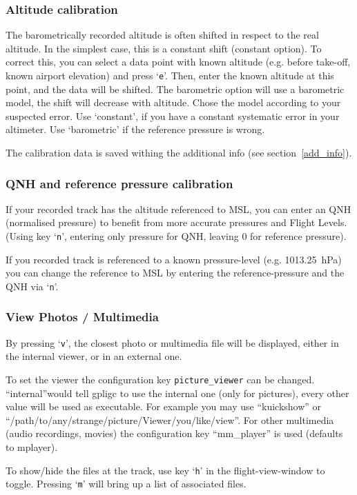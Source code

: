 \subsubsection{Altitude calibration}
The barometrically recorded altitude is often shifted in respect to the real altitude.
In the simplest case, this is a constant shift (constant option).
To correct this, you can select a data point with known altitude
(e.g. before take-off, known airport elevation) and press `\texttt{e}'.
Then, enter the known altitude at this point, and the data will be shifted.
The barometric option will use a barometric model, the shift will decrease with altitude.
Chose the model according to your suspected error. Use `constant', if you have a constant systematic error in your altimeter.
Use `barometric' if the reference pressure is wrong.

The calibration data is saved withing the additional info (see section~\ref{add_info}).


\subsubsection{QNH and reference pressure calibration}
If your recorded track has the altitude referenced to MSL, you can enter an QNH (normalised pressure) to benefit from more accurate pressures and Flight Levels.
(Using key `\texttt{n}', entering only pressure for QNH, leaving 0 for reference pressure).

If you recorded track is referenced to a known pressure-level (e.g. 1013.25~hPa) you can change the reference to MSL by entering the reference-pressure and the QNH via `\texttt{n}'.


\subsubsection{View Photos / Multimedia}
By pressing `\texttt{v}', the closest photo or multimedia file will be displayed, either in
the internal viewer, or in an external one.

To set the viewer the configuration key \texttt{picture\_viewer} can be changed. ``internal''would tell
gpligc to use the internal one (only for pictures), every other value will be used as executable. For example you may use
``kuickshow'' or ``/path/to/any/strange/picture/Viewer/you/like/view''.
For other multimedia (audio recordings, movies) the configuration key ``mm\_player'' is used (defaults to mplayer).

To show/hide the files at the track, use key `\texttt{h}' in the flight-view-window to toggle. Pressing `\texttt{m}' will bring up a list of associated files.

